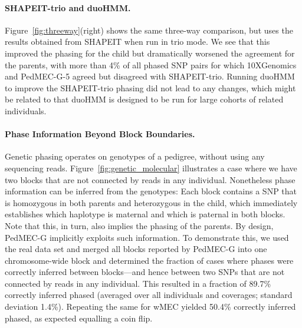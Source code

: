 \paragraph{SHAPEIT-trio and duoHMM.}
Figure~\ref{fig:threeway}(right) shows the same three-way comparison, but uses the results obtained from SHAPEIT when run in trio mode.
We see that this improved the phasing for the child but dramatically worsened the agreement for the parents, with more than 4\% of all phased SNP pairs for which 10XGenomics and \mbox{PedMEC-G-5} agreed but disagreed with SHAPEIT-trio.
Running duoHMM \citep{OConnell2014} to improve the SHAPEIT-trio phasing did not lead to any changes, which might be related to that duoHMM is designed to be run for large cohorts of related individuals.

\paragraph{Phase Information Beyond Block Boundaries.}
Genetic phasing operates on genotypes of a pedigree, without using any sequencing reads.
Figure~\ref{fig:genetic_molecular} illustrates a case where we have two blocks that are not connected by reads in any individual. 
Nonetheless phase information can be inferred from the genotypes: Each block contains a SNP that is homozygous in both parents and heterozygous in the child, which immediately establishes which haplotype is maternal and which is paternal in both blocks.
Note that this, in turn, also implies the phasing of the parents.
By design, PedMEC-G implicitly exploits such information.
To demonstrate this, we used the real data set and merged all blocks reported by PedMEC-G into one chromosome-wide block and determined the fraction of cases where phases were correctly inferred between blocks---and hence between two SNPs that are not connected by reads in any individual.
This resulted in a fraction of 89.7\% correctly inferred phased (averaged over all individuals and coverages; standard deviation 1.4\%).
Repeating the same for wMEC yielded 50.4\% correctly inferred phased, as expected equalling a coin flip.

